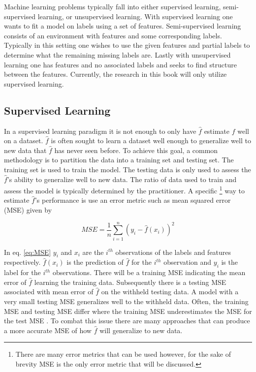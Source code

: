 Machine learning problems typically fall into either supervised learning, semi-supervised learning, or unsupervised learning. With supervised learning one wants to fit a model on labels using a set of features. Semi-supervised learning consists of an environment with features and some corresponding labels. Typically in this setting one wishes to use the given features and partial labels to determine what the remaining missing labels are. Lastly with unsupervised learning one has features and no associated labels and seeks to find structure between the features. Currently, the research in this book will only utilize supervised learning. 

\subsection{Supervised Learning} \label{sec:SupervisedLearning}
In a supervised learning paradigm it is not enough to only have \(\hat{f}\) estimate \(f\) well on a dataset. \(\hat{f}\) is often sought to learn a dataset well enough to generalize well to new data that  \(\hat{f}\) has never seen before. To achieve this goal, a common methodology is to partition the data into a training set and testing set. The training set is used to train the model. The testing data is only used to assess the \(\hat{f}\)'s ability to generalize well to new data. The ratio of data used to train and assess the model is typically determined by the practitioner.  A specific \footnote{There are many error metrics that can be used however, for the sake of brevity MSE is the only error metric that will be discussed. } way to estimate \(\hat{f}\)'s performance is use  an error metric such as mean squared error (MSE) given by  

\begin{equation}
\label{eq:MSE}
MSE = \frac{1}{n} \sum_{i=1}^n (y_i -\hat{f}(x_i))^2
\end{equation}

\noindent In eq. \ref{eq:MSE} \(y_i\) and \(x_i\) are the \(i^{th}\) observations of the labels and features respectively. \(\hat{f}(x_i)\) is the prediction of \(\hat{f}\) for the \(i^{th}\) observation and \(y_i\) is the label for the \(i^{th}\) observations. There will be a training MSE indicating the mean error of \(\hat{f}\) learning the training data. Subsequently there is a testing MSE associated with mean error of \(\hat{f}\) on the withheld testing data. A model with a very small testing MSE generalizes well to the withheld data. Often, the training MSE and testing MSE differ where the training MSE  underestimates the MSE for the test MSE \cite{ISL:Chapter5}. To combat this issue there are many approaches that can produce a more accurate MSE of how \(\hat{f}\) will generalize to new data.

